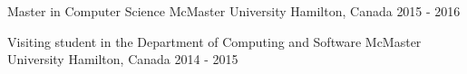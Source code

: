 \begin{cventries}
	\cvedu
    {Master in Computer Science}
    {McMaster University}
    {Hamilton, Canada}
    {2015 - 2016}
   
    \cvedu
    {Visiting student in the Department of Computing and Software}
    {McMaster University}
    {Hamilton, Canada}
    {2014 - 2015}
   
  

\end{cventries}
